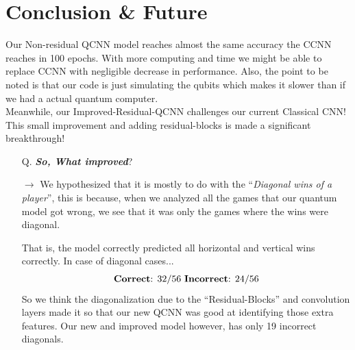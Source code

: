 \documentclass[a4paper]{article}
\begin{document}
\section*{Conclusion \& Future}

Our Non-residual QCNN model reaches almost the same accuracy the CCNN reaches in 100 epochs. With more computing and time we might be able to replace CCNN with negligible decrease in performance. Also, the point to be noted is that our code is just simulating the qubits which makes it slower than if we had a actual quantum computer.\\

Meanwhile, our Improved-Residual-QCNN challenges our current Classical CNN! This small improvement and adding residual-blocks is made a significant breakthrough!

\begin{itemize}
\item[Q.] \textbf{\emph{So, What improved}}?
\item[\textbf{$\rightarrow$}] We hypothesized that it is mostly to do with the ``\emph{Diagonal wins of a player}'', this is because, when we analyzed all the games that our quantum model got wrong, we see that it was only the games where the wins were diagonal.

That is, the model correctly predicted all horizontal and vertical wins correctly. In case of diagonal cases...
\[ \text{\textbf{Correct}: } 32/56 \text{ \textbf{Incorrect}: } 24/56 \]
So we think the diagonalization due to the ``Residual-Blocks'' and convolution layers made it so that our new QCNN was good at identifying those extra features. Our new and improved model however, has only 19 incorrect diagonals.
\end{itemize}
\end{document}
